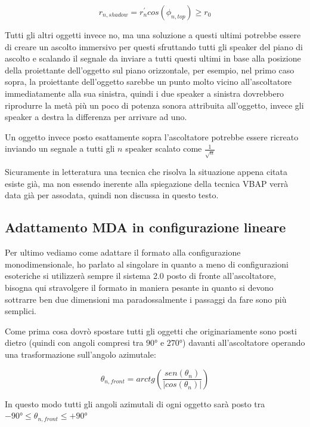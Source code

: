 \documentclass[12pt,a4paper]{report}
\begin{document}
\begin{itemize}
\begin{equation}
r_{n,shadow}=r_n^{\prime} cos(\phi_{n,top}) \geq r_0
\label{zzz}
\end{equation}

Tutti gli altri oggetti invece no, ma una soluzione a questi ultimi potrebbe essere di creare un ascolto immersivo per questi sfruttando tutti gli speaker del piano di ascolto e scalando il segnale da inviare a tutti questi ultimi in base alla posizione della proiettante dell'oggetto sul piano orizzontale, per esempio, nel primo caso sopra, la proiettante dell'oggetto sarebbe un punto molto vicino all'ascoltatore immediatamente alla sua sinistra, quindi i due speaker a sinistra dovrebbero riprodurre la metà più un poco di potenza sonora attribuita all'oggetto, invece gli speaker a destra la differenza per arrivare ad uno.

Un oggetto invece posto esattamente sopra l'ascoltatore potrebbe essere ricreato inviando un segnale a tutti gli $n$ speaker scalato come $\frac{1}{\sqrt{n}}$

Sicuramente in letteratura una tecnica che risolva la situazione appena citata esiste già, ma non essendo inerente alla spiegazione della tecnica VBAP verrà data già per assodata, quindi non discussa in questo testo.

\subsection{Adattamento MDA in configurazione lineare}

Per ultimo vediamo come adattare il formato alla configurazione monodimensionale, ho parlato al singolare in quanto a meno di configurazioni esoteriche si utilizzerà sempre il sistema 2.0 posto di fronte all'ascoltatore, bisogna qui stravolgere il formato in maniera pesante in quanto si devono sottrarre ben due dimensioni ma paradossalmente i passaggi da fare sono più semplici.

Come prima cosa dovrò spostare tutti gli oggetti che originariamente sono posti dietro (quindi con angoli compresi tra $90°$ e $270°$) davanti all'ascoltatore operando una trasformazione sull'angolo azimutale:

\begin{equation}
\theta_{n,front} = arctg  \left( \dfrac{sen(\theta_n)}{\vert cos(\theta_n)\vert } \right)
\label{llll}
\end{equation}

In questo modo tutti gli angoli azimutali di ogni oggetto sarà posto tra $-90° \leq \theta_{n,front} \leq +90°$


\end{itemize}
\end{document}
